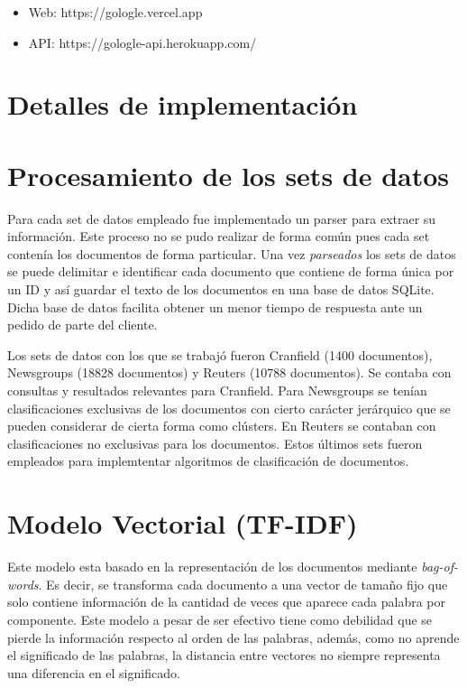 \documentclass[12pt]{llncs}
\begin{document}
\begin{itemize}
  \item Web: https://gologle.vercel.app
  \item API: https://gologle-api.herokuapp.com/
\end{itemize}

\section*{Detalles de implementación}

\section{Procesamiento de los sets de datos}

Para cada set de datos empleado fue implementado un parser para extraer su información. Este proceso no se pudo realizar de forma común pues cada set contenía los documentos de forma particular. Una vez \textit{parseados} los sets de datos se puede delimitar e identificar cada documento que contiene de forma única por un ID y así guardar el texto de los documentos en una base de datos SQLite. Dicha base de datos facilita obtener un menor tiempo de respuesta ante un pedido de parte del cliente.

Los sets de datos con los que se trabajó fueron Cranfield (1400 documentos), Newsgroups (18828 documentos) y Reuters (10788 documentos). Se contaba con consultas y resultados relevantes para Cranfield. Para  Newsgroups se tenían clasificaciones exclusivas de los documentos con cierto carácter jerárquico que se pueden considerar de cierta forma como clústers. En Reuters se contaban con clasificaciones no exclusivas para los documentos. Estos últimos sets fueron empleados para implemtentar algoritmos de clasificación de documentos.

\section{Modelo Vectorial (TF-IDF) \cite{conf} } 

Este modelo esta basado en la representación de los documentos mediante \textit{bag-of-words}. Es decir, se transforma cada documento a una vector de tamaño fijo que solo contiene información de la cantidad de veces que aparece cada palabra por componente. Este modelo a pesar de ser efectivo tiene como debilidad que se pierde la información respecto al orden de las palabras, además, como no aprende el significado de las palabras, la distancia entre vectores no siempre representa una diferencia en el significado. 
\end{document}
